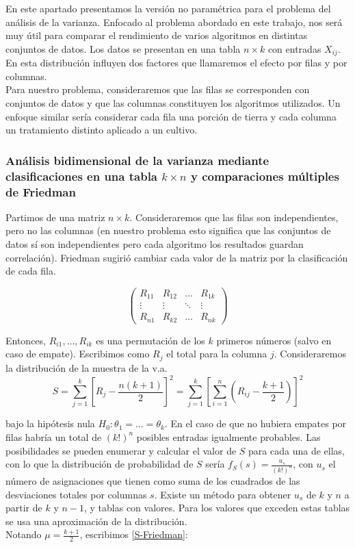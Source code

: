 	En este apartado presentamos la versión no paramétrica 
para el problema del análisis de la varianza. Enfocado al 
problema abordado en este trabajo, nos será muy útil para 
comparar el rendimiento de varios algoritmos en distintas 
conjuntos de datos. Los datos se presentan en una tabla $n \times 
k$ con entradas $X_{ij}$. En esta distribución influyen dos 
factores que llamaremos el efecto por filas y por columnas.\\
	Para nuestro problema, consideraremos que las filas se 
corresponden con conjuntos de datos y que las columnas 
constituyen los algoritmos utilizados. Un enfoque similar 
sería considerar cada fila una porción de tierra y cada 
columna un tratamiento distinto aplicado a un cultivo.
	
\subsubsection{Análisis bidimensional de la varianza mediante clasificaciones en una tabla $k \times n$ y comparaciones múltiples de Friedman}

	Partimos de una matriz $n \times k$. Consideraremos que 
las filas son independientes, pero no las columnas (en 
nuestro problema esto significa que las conjuntos de datos sí 
son independientes pero cada algoritmo los resultados guardan 
correlación). Friedman sugirió cambiar cada valor de la 
matriz por la clasificación de cada fila.
	
	\[ \left( \begin{matrix}
		R_{11} & R_{12} & \dots & R_{1k} \\
		\vdots & \vdots & \ddots & \vdots \\
		R_{n1} & R_{k2} & \dots & R_{nk}
		\end{matrix} \right)	\]

	Entonces, $R_{i1}, \dots, R_{ik}$ es una permutación de 
los $k$ primeros números (salvo en caso de empate). 
Escribimos como $R_j$ el total para la columna $j$. 
Consideraremos la distribución de la muestra de la v.a. 
	\begin{equation}
		 S = \sum\limits_{j=1}^k
				\left[
					R_j - \frac{n(k+1)}{2}
				\right]^2 =
			\sum\limits_{j=1}^k \left[
				\sum\limits_{i=1}^n \left(
					R_{ij} - \frac{k+1}{2}
				\right)
			\right]^2
	\label{S-Friedman}
	\end{equation}
	
	bajo la hipótesis nula $H_0: \theta_1 = \dots = 
\theta_k$. En el caso de que no hubiera empates por filas 
habría un total de $(k!)^n$ posibles entradas igualmente 
probables. Las posibilidades se pueden enumerar y calcular el 
valor de $S$ para cada una de ellas, con lo que la 
distribución de probabilidad de $S$ sería $f_S(s) = 
\frac{u_s}{(k!)^n}$, con $u_s$ el número de asignaciones que 
tienen como suma de los cuadrados de las desviaciones totales 
por columnas $s$. Existe un método para obtener $u_s$ de $k$ 
y $n$ a partir de $k$ y $n-1$, y tablas con valores. Para los 
valores que exceden estas tablas se usa una aproximación de 
la distribución.\\
	Notando $\mu = \frac{k+1}{2}$, escribimos 
	\ref{S-Friedman}:
	
